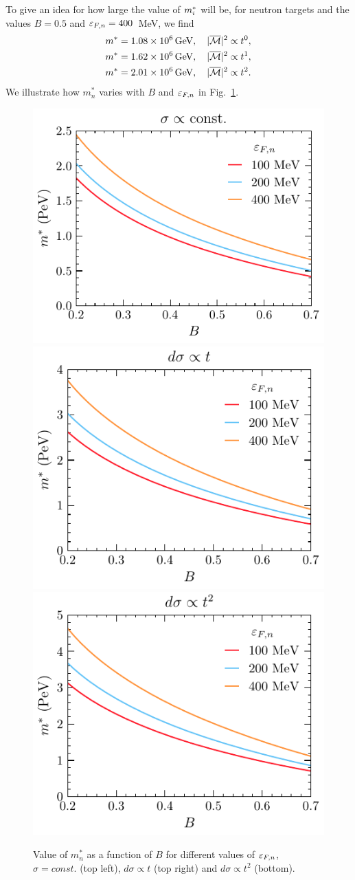 To give an idea for how large the value of $m_i^*$ will be, for neutron targets and the values $B=0.5$ and $\varepsilon_{F,n}=400$~MeV, we find
\begin{align}
m^{*} &=1.08 \times 10^6 {\rm \,GeV},\quad |\overline{\mathcal M}|^2\propto t^0,\\
m^{*} &=1.62 \times 10^6 {\rm \,GeV},\quad |\overline{\mathcal M}|^2\propto t^1,\\
m^{*} &=2.01 \times 10^6 {\rm \,GeV},\quad |\overline{\mathcal M}|^2\propto t^2.
\end{align}
We illustrate how $m^*_n$ varies with $B$ and $\varepsilon_{F,n}$ in Fig.~\ref{ch3:fig:mstarbmu}. 

\begin{figure}[t!bp]
    \centering
    \includegraphics[width=.48\textwidth]{capture_1/mstar_B_n0.pdf}
    \includegraphics[width=.48\textwidth]{capture_1/mstar_B_n1.pdf}    
    \includegraphics[width=.48\textwidth]{capture_1/mstar_B_n2.pdf}      
    \caption{Value of $m^*_n$ as a function of $B$ for different values of $\varepsilon_{F,n}$, $\sigma=const.$ (top left), $d\sigma\propto t$ (top right) and $d\sigma\propto t^2$ (bottom).}
    \label{ch3:fig:mstarbmu}
\end{figure}

